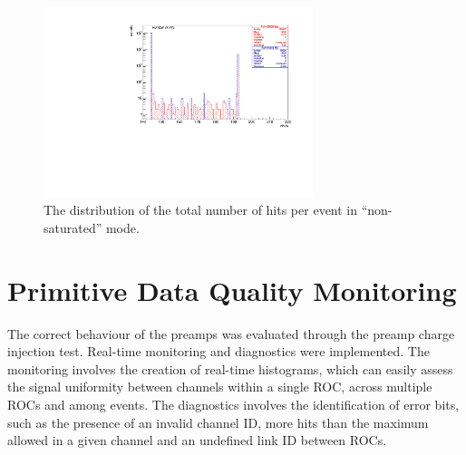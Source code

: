 \begin{figure}[!h]
\centering
\includegraphics[width =0.7\textwidth]{figures/pdf/figure_00009_nhits_105038.pdf}
\caption{
  The distribution of the total number of hits per event in ``non-saturated'' mode.
}
\label{fig:6}
\end{figure}
\section{Primitive Data Quality Monitoring}\label{dqm}
The correct behaviour of the preamps was evaluated through the preamp charge injection test. Real-time monitoring and diagnostics were implemented.
The monitoring involves the creation of real-time histograms, which can easily assess 
the signal uniformity between channels within a single ROC, across multiple ROCs and among events.
The diagnostics involves the identification of error bits, such as the presence of an 
invalid channel ID, more hits than the maximum allowed in a given channel and an undefined link ID between ROCs.

